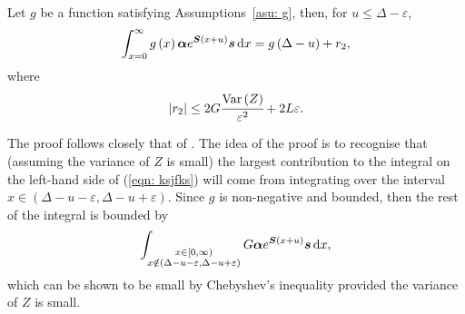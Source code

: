 \begin{lem}\label{lemma:bound}
	Let \(g\) be a function satisfying Assumptions~\ref{asu: g}, then, for \(u \leq \Delta - \varepsilon\), 
	\begin{align}
		\int_{x=0}^\infty g\left(x\right)\boldsymbol \alpha e^{\boldsymbol{S}\left(x+u\right)} \boldsymbol s \, \mathrm{d} x = g\left(\Delta-u\right) + r_2,\label{eqn: ksjfks}
	\end{align}
	where 
	\[\left|r_2\right|\leq 2G\cfrac{\mathrm{Var} \left(Z\right)}{\varepsilon^2} + 2L\varepsilon.\]
\end{lem}
The proof follows closely that of \cite[Appendix A, Theorem 4]{hht2020}. The idea of the proof is to recognise that (assuming the variance of \(Z\) is small) the largest contribution to the integral on the left-hand side of (\ref{eqn: ksjfks}) will come from integrating over the interval \(x\in(\Delta-u-\varepsilon,\Delta-u+\varepsilon)\). Since \(g\) is non-negative and bounded, then the rest of the integral is bounded by 
\[\int_{\substack{x\in[0,\infty)\\x\notin(\Delta-u-\varepsilon,\Delta-u+\varepsilon)}} G\boldsymbol \alpha e^{\boldsymbol{S}\left(x+u\right)} \boldsymbol s \, \mathrm{d} x,\]
which can be shown to be small by Chebyshev's inequality provided the variance of \(Z\) is small. 
